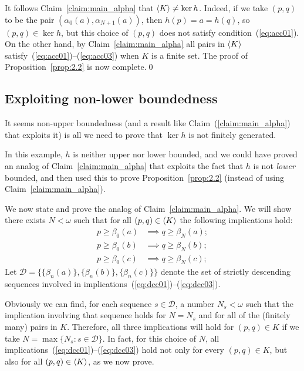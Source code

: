   
  It follows Claim~\ref{claim:main_alpha} that 
  $\langle K\rangle \neq \ker h$. Indeed, if we take $(p, q)$ to be 
  the pair $(\alpha_0(a), \alpha_{N+1}(a))$, then  $h(p) = a = h(q)$, 
  so $(p,q) \in \ker h$, but this choice of $(p,q)$ does not satisfy 
  condition~(\ref{eq:acc01}). On 
  the other hand, by Claim~\ref{claim:main_alpha} all pairs in $\langle K\rangle$ 
  satisfy~(\ref{eq:acc01})--(\ref{eq:acc03}) when $K$ is a finite set.   The 
  proof of Proposition~\ref{prop:2.2} is now complete.\qed
  

  \subsection{Exploiting non-lower boundedness}
  It seems non-upper boundedness (and a result like Claim~(\ref{claim:main_alpha}) 
that exploits it) is all we need to prove that
$\ker h$ is not finitely generated.

In this example, $h$ is neither upper nor lower bounded,
and we could have proved an analog of Claim~\ref{claim:main_alpha} 
that exploits the fact that $h$ is not \emph{lower} bounded,
and then used this to prove Proposition~\ref{prop:2.2} (instead of 
using Claim~\ref{claim:main_alpha}).

We now state and prove the analog of Claim~\ref{claim:main_alpha}.
We will show there exists $N < \omega$ such that 
for all $(p, q) \in \langle K\rangle$ 
the following implications hold:
\begin{align}
  p \geq \beta_0(a) &\implies q \geq \beta_N(a); \label{eq:dcc01}\\
  p \geq \beta_0(b) &\implies q \geq \beta_N(b); \label{eq:dcc02}\\ 
  p \geq \beta_0(c) &\implies q \geq \beta_N(c); \label{eq:dcc03}
\end{align}
Let $\mathcal D = \{\{\beta_n(a)\}, \{\beta_n(b)\}, \{\beta_n(c)\}\}$
denote the set of strictly descending 
sequences involved in implications~(\ref{eq:dcc01})--(\ref{eq:dcc03}).

Obviously we can find, for each sequence $s \in \mathcal D$,
a number $N_s < \omega$ such that the implication involving that sequence 
holds for $N = N_s$ and for all of the (finitely many) pairs in $K$.  
Therefore, all three implications will hold for $(p, q) \in K$ if we take 
$N = \max \{N_{s} : s \in \mathcal D\}$.
In fact, for this choice of $N$, all implications~(\ref{eq:dcc01})--(\ref{eq:dcc03}) hold 
not only for every $(p, q) \in K$, but also for all $(p, q) \in \langle K\rangle$,
as we now prove.

